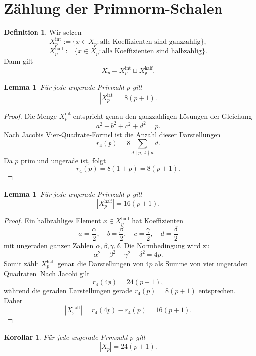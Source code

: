 \documentclass[a4paper,12pt]{article}
\newtheorem{lemma}[satz]{Lemma}
\newtheorem{korollar}[satz]{Korollar}
\theoremstyle{definition}
\newtheorem{definition}[satz]{Definition}
\numberwithin{equation}{section}
\begin{document}
	\section{Zählung der Primnorm-Schalen}
	
	\begin{definition}
		Wir setzen
		\[
		X_p^{\mathrm{int}}
		:=
		\{x\in X_p:\text{alle Koeffizienten sind ganzzahlig}\},
		\]
		\[
		X_p^{\mathrm{half}}
		:=
		\{x\in X_p:\text{alle Koeffizienten sind halbzahlig}\}.
		\]
		Dann gilt
		\[
		X_p=X_p^{\mathrm{int}}\sqcup X_p^{\mathrm{half}}.
		\]
	\end{definition}
	
	\begin{lemma}
		Für jede ungerade Primzahl \(p\) gilt
		\[
		|X_p^{\mathrm{int}}|=8(p+1).
		\]
	\end{lemma}
	
	\begin{proof}
		Die Menge \(X_p^{\mathrm{int}}\) entspricht genau den ganzzahligen Lösungen der Gleichung
		\[
		a^2+b^2+c^2+d^2=p.
		\]
		Nach Jacobis Vier-Quadrate-Formel ist die Anzahl dieser Darstellungen
		\[
		r_4(p)=8\sum_{d\mid p,\;4\nmid d} d.
		\]
		Da \(p\) prim und ungerade ist, folgt
		\[
		r_4(p)=8(1+p)=8(p+1).
		\]
	\end{proof}
	
	\begin{lemma}
		Für jede ungerade Primzahl \(p\) gilt
		\[
		|X_p^{\mathrm{half}}|=16(p+1).
		\]
	\end{lemma}
	
	\begin{proof}
		Ein halbzahliges Element \(x\in X_p^{\mathrm{half}}\) hat Koeffizienten
		\[
		a=\frac{\alpha}{2},\quad b=\frac{\beta}{2},\quad c=\frac{\gamma}{2},\quad d=\frac{\delta}{2}
		\]
		mit ungeraden ganzen Zahlen \(\alpha,\beta,\gamma,\delta\). Die Normbedingung wird zu
		\[
		\alpha^2+\beta^2+\gamma^2+\delta^2=4p.
		\]
		Somit zählt \(X_p^{\mathrm{half}}\) genau die Darstellungen von \(4p\) als Summe von vier ungeraden Quadraten. Nach Jacobi gilt
		\[
		r_4(4p)=24(p+1),
		\]
		während die geraden Darstellungen gerade \(r_4(p)=8(p+1)\) entsprechen. Daher
		\[
		|X_p^{\mathrm{half}}|=r_4(4p)-r_4(p)=16(p+1).
		\]
	\end{proof}
	
	\begin{korollar}
		Für jede ungerade Primzahl \(p\) gilt
		\[
		|X_p|=24(p+1).
		\]
	\end{korollar}
	
\end{document}
